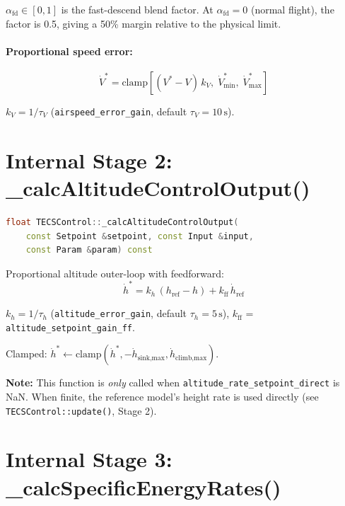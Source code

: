 \documentclass[12pt,a4paper]{article}
\begin{document}
$\alpha_{\text{fd}} \in [0,1]$ is the fast-descend blend factor.
At $\alpha_{\text{fd}} = 0$ (normal flight), the factor is 0.5,
giving a 50\% margin relative to the physical limit.

\paragraph{Proportional speed error:}
\begin{equation}
  \dot{V}^* = \text{clamp}\!\left[(V^* - V)\,k_V,\;\dot{V}^*_{\min},\;\dot{V}^*_{\max}\right]
\end{equation}

$k_V = 1/\tau_V$ (\texttt{airspeed\_error\_gain}, default $\tau_V = 10\,\text{s}$).

\section{Internal Stage 2: \_calcAltitudeControlOutput()}

\begin{lstlisting}[language=C++]
float TECSControl::_calcAltitudeControlOutput(
    const Setpoint &setpoint, const Input &input,
    const Param &param) const
\end{lstlisting}

Proportional altitude outer-loop with feedforward:
\begin{equation}
  \dot{h}^* = k_h\,(h_{\text{ref}} - h) + k_{\text{ff}}\,\dot{h}_{\text{ref}}
\end{equation}

$k_h = 1/\tau_h$ (\texttt{altitude\_error\_gain}, default $\tau_h = 5\,\text{s}$),
$k_{\text{ff}}$ = \texttt{altitude\_setpoint\_gain\_ff}.

Clamped: $\dot{h}^* \leftarrow \text{clamp}(\dot{h}^*, -\dot{h}_{\text{sink,max}}, \dot{h}_{\text{climb,max}})$.

\textbf{Note:} This function is \emph{only} called when
\texttt{altitude\_rate\_setpoint\_direct} is NaN.
When finite, the reference model's height rate is used directly
(see \texttt{TECSControl::update()}, Stage 2).

\section{Internal Stage 3: \_calcSpecificEnergyRates()}
\end{document}
